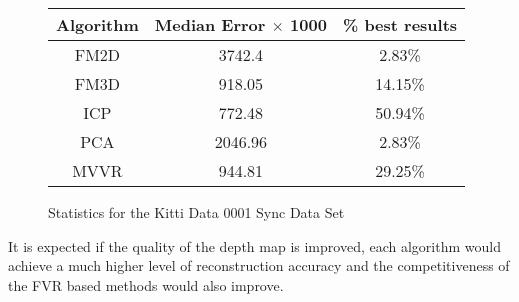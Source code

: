 \begin{figure}
\centering
\begin{tabular}{ccc}
\hline
\textbf{Algorithm} & \textbf{Median Error $\times$ 1000} & \textbf{\% best results}\\ \hline
FM2D	& 3742.4 & 2.83\%\\
FM3D	& 918.05 & 14.15\%\\
ICP	& 772.48 & 50.94\%\\
PCA	& 2046.96 & 2.83\%\\
MVVR	& 944.81 & 29.25\%\\
\end{tabular}
\caption{Statistics for the Kitti Data 0001 Sync Data Set}
\label{table:MVVRQuantitativeExperimentResults}
\end{figure} 

It is expected if the quality of the depth map is improved, each algorithm would achieve a much higher level of reconstruction accuracy and the competitiveness of the FVR based methods would also improve. \\
